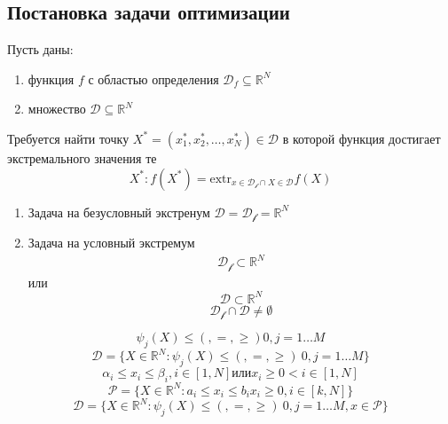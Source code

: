 \documentclass[14pt]{extarticle}
\begin{document}
\subsection{Постановка задачи оптимизации}
Пусть даны:
\begin{enumerate}
	\item функция $f$ с областью определения $\mathcal{D}_{f} \subseteq \mathbb{R}^{N}$
	\item множество $\mathcal{D} \subseteq \mathbb{R}^{N}$
\end{enumerate}
Требуется найти точку $X^{*} = (x_1^{*},x_2^{*},\dots,x^{*}_{N}) \in \mathcal{D}$ 
в которой функция достигает экстремального значения те
\begin{equation}
	X^{*}:f(X^{*}) = \text{extr}_{x \in \mathcal{D_{f}}  \cap X \in \mathcal{D}} f(X)
\end{equation}
\begin{enumerate}
	\item Задача на безусловный экстренум $\mathcal{D} = \mathcal{D_{f}} = \mathbb{R}^{N}$ 
	\item Задача на условный экстремум 
		\begin{eqnarray}
			\mathcal{D_{f}} \subset \mathbb{R}^{N}
		\end{eqnarray}
		или
		\begin{equation}
			\mathcal{D} \subset \mathbb{R}^{N}
		\end{equation}
		\begin{equation}
			\mathcal{D_{f}} \cap \mathcal{D} \neq \emptyset
		\end{equation}
\end{enumerate}
\begin{equation}
	\psi_{j}(X) \le (,=,\ge ) 0, j = 1 \dots M
\end{equation}
\begin{equation}
	\mathcal{D} = \{X \in \mathbb{R}^{N}  : 
	\psi_{j}(X) \le (,=,\ge ) ~0,j = 1 \dots M\}
\end{equation}
\begin{equation}
	\alpha_{i} \le x_{i} \le  \beta_{i} , i \in [1,N] \text{или} x_{i} \ge  0< i \in [1,N]
\end{equation}
\begin{equation}
	\mathcal{P} = \{X \in \mathbb{R}^{N} : a_i \le  x_{i} \le b_{i}
	x_{i} \ge  0,i \in [k,N]\}
\end{equation}
\begin{equation}
	\mathcal{D} = \{X \in \mathbb{R}^{N}  : 
	\psi_{j}(X) \le (,=,\ge ) ~0,j = 1 \dots M, x\in \mathcal{P}\}
\end{equation}
\end{document}
